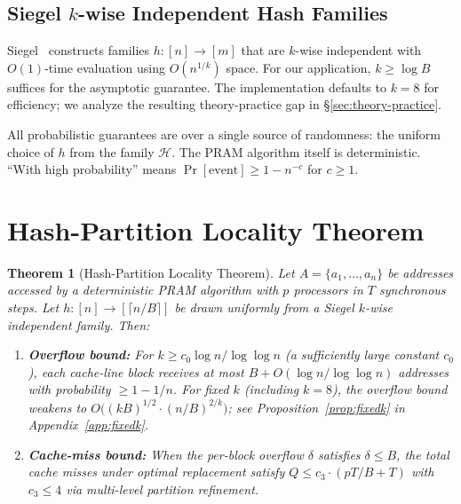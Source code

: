 \documentclass[11pt]{article}
\newtheorem{theorem}{Theorem}
\begin{document}
\subsection{Siegel $k$-wise Independent Hash Families}

Siegel~\cite{siegel2004universal} constructs families $h: [n] \to [m]$
that are $k$-wise independent with $O(1)$-time evaluation using
$O(n^{1/k})$ space.  For our application, $k \ge \log B$ suffices for
the asymptotic guarantee.  The implementation defaults to $k = 8$ for
efficiency; we analyze the resulting theory-practice gap in
\S\ref{sec:theory-practice}.

All probabilistic guarantees are over a single source of randomness: the
uniform choice of $h$ from the family $\mathcal{H}$.  The PRAM algorithm
itself is deterministic.  ``With high probability'' means
$\Pr[\text{event}] \ge 1 - n^{-c}$ for $c \ge 1$.

\section{Hash-Partition Locality Theorem}
\label{sec:theory}

\begin{theorem}[Hash-Partition Locality Theorem]
\label{thm:hplt}
Let $A = \{a_1, \ldots, a_n\}$ be addresses accessed by a deterministic
PRAM algorithm with $p$ processors in $T$ synchronous steps.  Let
$h: [n] \to [\lceil n/B \rceil]$ be drawn uniformly from a Siegel
$k$-wise independent family.  Then:
\begin{enumerate}
\item \textbf{Overflow bound:} For $k \ge c_0 \log n / \log\log n$
  (a sufficiently large constant $c_0$), each cache-line block receives
  at most $B + O(\log n / \log\log n)$ addresses with probability
  $\ge 1 - 1/n$.  For fixed $k$ (including $k = 8$), the overflow
  bound weakens to $O\bigl((kB)^{1/2} \cdot (n/B)^{2/k}\bigr)$;
  see Proposition~\ref{prop:fixedk} in Appendix~\ref{app:fixedk}.
\item \textbf{Cache-miss bound:} When the per-block overflow $\delta$
  satisfies $\delta \le B$, the total cache misses under optimal
  replacement satisfy $Q \le c_3 \cdot (pT/B + T)$ with $c_3 \le 4$
  via multi-level partition refinement.
\end{enumerate}
\end{theorem}
\end{document}
